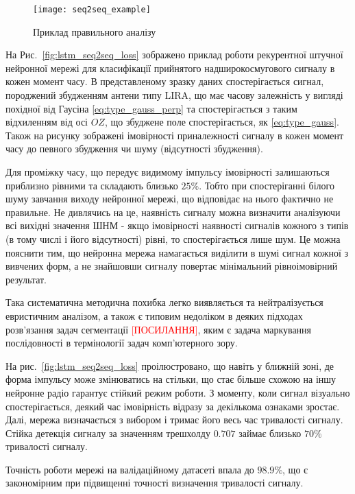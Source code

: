 \begin{figure}[htbp] \begin{center}
\texttt{[image: seq2seq\_example]}
\caption{Приклад правильного аналізу} \label{fig:seq2seq_example}
\end{center} \end{figure}

На Рис.~\ref{fig:lstm_seq2seq_loss} зображено приклад роботи рекурентної 
штучної нейронної мережі для класифікації прийнятого надширокосмугового сигналу 
в кожен момент часу. В представленому зразку даних спостерігається сигнал,
породжений збудженням антени типу LIRA, що має часову залежність у вигляді 
похідної від Гаусіна \eqref{eq:type_gauss_perp} та спостерігається з 
таким відхиленням від осі $ OZ $, що збуджене поле спостерігається, як 
\eqref{eq:type_gauss}. Також на рисунку зображені імовірності приналежності 
сигналу в кожен момент часу до певного збудження чи шуму (відсутності 
збудження).

Для проміжку часу, що передує видимому імпульсу імовірності залишаються 
приблизно рівними та складають близько $ 25 \% $. Тобто при спостеріганні 
білого шуму завчання виходу нейронної мережі, що відповідає на нього 
фактично не правильне. Не дивлячись на це, наявність сигналу можна визначити
аналізуючи всі вихідні значення ШНМ - якщо імовірності наявності сигналів 
кожного з типів (в тому числі і його відсутності) рівні, то спостерігається 
лише шум. Це можна пояснити тим, що нейронна мережа намагається виділити в 
шумі сигнал кожної з вивчених форм, а не знайшовши сигналу повертає 
мінімальний рівноімовірний результат. 

Така систематична методична похибка легко виявляється та нейтралізується 
евристичним аналізом, а також є типовим недоліком в деяких підходах 
розв'язання задач сегментації \textcolor{red}{[ПОСИЛАННЯ]}, яким є задача
маркування послідовності в термінології задач комп'ютерного зору.

На рис.~\ref{fig:lstm_seq2seq_loss} проілюстровано, що навіть у ближній зоні, 
де форма імпульсу може змінюватись на стільки, що стає більше схожою на іншу
нейронне радіо гарантує стійкий режим роботи. З моменту, коли сигнал 
візуально спостерігається, деякий час імовірність відразу за декількома 
ознаками зростає. Далі, мережа визначається з вибором і тримає його весь
час тривалості сигналу. Стійка детекція сигналу за значенням трешхолду 
$ 0.707 $ займає близько $ 70\% $ тривалості сигналу.

Точність роботи мережі на валідаційному датасеті впала до $ 98.9\% $,
що є закономірним при підвищенні точності визначення тривалості сигналу.

